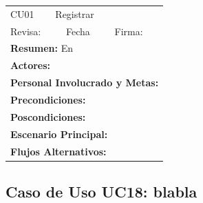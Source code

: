 \begin{longtable}{|l|p{5.5cm}|l|p{2cm}|l|p{1.9cm}|} \hline
    \cellcolor{grisOscuro} CU01 & \multicolumn{4}{|l|}{  \cellcolor{grisOscuro} Registrar} &  \cellcolor{grisClaro}\multirow{2}{1cm}{} \\ \cline{1-5}
    \cellcolor{grisOscuro} Revisa: &  \cellcolor{grisClaro} &  \cellcolor{grisOscuro} Fecha &  \cellcolor{grisClaro} &  \cellcolor{grisOscuro} Firma: & \cellcolor{grisClaro} \\ \hline
    \multicolumn{6}{|p{15cm}|}{ \textbf{Resumen: } En

    } \\ \hline

    \multicolumn{6}{|p{15cm}|}{ \textbf{Actores: }

    } \\ \hline

    \multicolumn{6}{|p{15cm}|}{ \textbf{Personal Involucrado y Metas: }

    } \\ \hline

    \multicolumn{6}{|p{15cm}|}{ \textbf{Precondiciones: }

    } \\ \hline

    \multicolumn{6}{|p{15cm}|}{ \textbf{Poscondiciones: }

    } \\ \hline

    \multicolumn{6}{|p{15cm}|}{ \textbf{Escenario Principal: }

    } \\ \hline

    \multicolumn{6}{|p{15cm}|}{ \textbf{Flujos Alternativos: }

    } \\ \hline

\end{longtable}


\subsection{Caso de Uso UC18: blabla}

